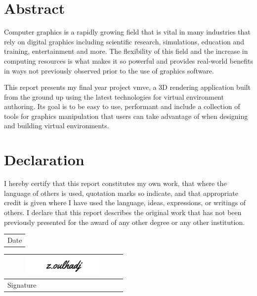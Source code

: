 \documentclass[11pt]{article}
\begin{document}
\pagebreak

\section*{Abstract}
Computer graphics is a rapidly growing field that is vital in many industries
that rely on digital graphics including scientific research, simulations,
education and training, entertainment and more. The flexibility of this field
and the increase in computing resources is what makes it so powerful and
provides real-world benefits in ways not previously observed prior to the use of
graphics software.

This report presents my final year project \gls{vmve}, a 3D rendering
application built from the ground up using the latest technologies for virtual
environment authoring. Its goal is to be easy to use, performant and include a
collection of tools for graphics manipulation that users can take advantage of
when designing and building virtual environments.


\pagebreak

\section*{Declaration}
I hereby certify that this report constitutes my own work, that where
the language of others is used, quotation marks so indicate, and that
appropriate credit is given where I have used the language, ideas,
expressions, or writings of others. I declare that this report
describes the original work that has not been previously presented for
the award of any other degree or any other institution.

\noindent
\begin{tabular}[b]{@{} p{6cm} @{}}
\date{\today} \\
\hline
\scriptsize Date
\end{tabular}\qquad
\begin{tabular}[b]{@{} p{6cm} @{}}
\includegraphics[width=6cm,height=1cm]{images/signature.png} \\
\hline
\scriptsize Signature
\end{tabular}



\pagebreak
\tableofcontents
{}
\pagebreak
\end{document}
